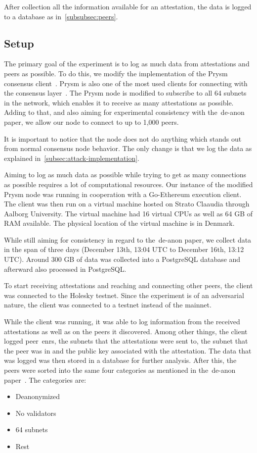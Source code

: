 After collection all the information available for an attestation,
the data is logged to a database as in~\autoref{subsubsec:peers}.

\subsection{Setup}\label{subsec:setup}
The primary goal of the experiment is to log as much data from attestations and peers as possible.
To do this, we modify the implementation of the Prysm consensus client~\cite{prysm}.
Prysm is also one of the most used clients for connecting with the consensus layer~\cite{client-diversity}.
The Prysm node is modified to subscribe to all 64 subnets in the network, which enables it to receive as many attestations as possible.
Adding to that, and also aiming for experimental consistency with the~\gls{de-anon paper}, we allow our node to connect to up to 1,000 peers.

It is important to notice that the node does not do anything which stands out from normal consensus node behavior.
The only change is that we log the data as explained in~\autoref{subsec:attack-implementation}.

Aiming to log as much data as possible while trying to get as many connections as possible requires a lot of computational resources.
Our instance of the modified Prysm node was running in cooperation with a Go-Ethereum execution client.
The client was then run on a virtual machine hosted on Strato Claaudia through Aalborg University.
The virtual machine had 16 virtual CPUs as well as 64 GB of RAM available.
The physical location of the virtual machine is in Denmark.

While still aiming for consistency in regard to the~\gls{de-anon paper}, we collect data in the span of three days (December 13th, 13:04 UTC to December 16th, 13:12 UTC).
Around 300 GB of data was collected into a PostgreSQL database and afterward also processed in PostgreSQL\@.


To start receiving attestations and reaching and connecting other peers,
the client was connected to the Holesky testnet.
Since the experiment is of an adversarial nature, the client was connected to a testnet instead of the mainnet.

While the client was running,
it was able to log information from the received attestations as well as on the peers it discovered.
Among other things, the client logged peer~\glspl{enr}, the subnets that the attestations were sent to,
the subnet that the peer was in and the public key associated with the attestation.
The data that was logged was then stored in a database for further analysis.
After this,
the peers were sorted into the same four categories
as mentioned in the~\gls{de-anon paper}~\cite{heimbach2024deanonymizingethereumvalidatorsp2p}.
The categories are:
\begin{itemize}
    \item Deanonymized
    \item No validators
    \item 64 subnets
    \item Rest
\end{itemize}

